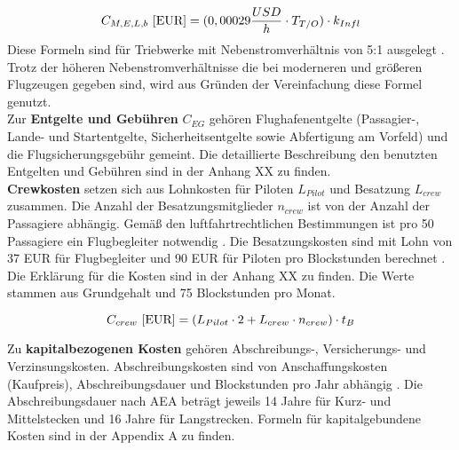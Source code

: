 \begin{equation}
   {C_{M,E,L,b} ~[\text{EUR}]} = (0,00029 \frac{USD}{h} \cdot T_{T/O} )\cdot k_{Infl}\\
   \label{maintenance engine}
\end{equation}
%
Diese Formeln sind für Triebwerke mit Nebenstromverhältnis von 5:1 ausgelegt \cite{bruge2018wartungskosten}. %
Trotz der höheren Nebenstromverhältnisse die bei moderneren und größeren Flugzeugen gegeben sind,
wird aus Gründen der Vereinfachung diese Formel genutzt.\\
%
%
%
Zur \textbf{Entgelte und Gebühren} $C_{EG}$ gehören Flughafenentgelte (Passagier-, Lande- und Startentgelte, Sicherheitsentgelte sowie Abfertigung am 
Vorfeld) und die Flugsicherungsgebühr gemeint. Die detaillierte Beschreibung den benutzten Entgelten und Gebühren sind in der Anhang XX zu finden.\\

\textbf{Crewkosten} setzen sich aus Lohnkosten für Piloten $L_{Pilot}$ und Besatzung $L_{crew}$ zusammen. 
Die Anzahl der Besatzungsmitglieder $n_{crew}$ ist von der Anzahl der Passagiere abhängig. 
Gemäß den luftfahrtrechtlichen Bestimmungen ist pro 50 Passagiere ein Flugbegleiter notwendig \cite{conrady2019luftverkehr}.
Die Besatzungskosten sind mit Lohn von 37 EUR für Flugbegleiter und 90 EUR für Piloten pro Blockstunden berechnet \cite{discover_airlines_cabin}.
Die Erklärung für die Kosten sind in der Anhang XX zu finden. Die Werte stammen aus Grundgehalt und 75 Blockstunden pro Monat.

\begin{equation}
   {C_{crew} ~[\text{EUR}]} = ({L}_{Pilot} \cdot 2 + {L}_{crew} \cdot n_{crew} ) \cdot t_{B} \\
   \label{crew cost}
\end{equation}


Zu \textbf{kapitalbezogenen Kosten} gehören Abschreibungs-, Versicherungs- und Verzinsungskosten. 
Abschreibungskosten sind von Anschaffungskosten (Kaufpreis), Abschreibungsdauer und Blockstunden pro Jahr abhängig \cite{conrady2019luftverkehr}.
Die Abschreibungsdauer nach AEA beträgt jeweils 14 Jahre für Kurz- und Mittelstecken und 16 Jahre für Langstrecken.
Formeln für kapitalgebundene Kosten sind in der Appendix A zu finden.

